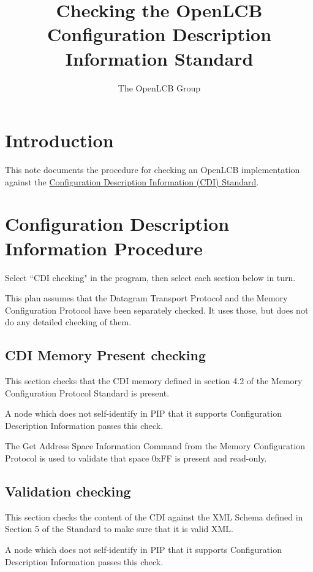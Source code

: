 \documentclass[11pt]{article}
\title{Checking the OpenLCB Configuration Description Information Standard}
\author{The OpenLCB Group}
\begin{document}
\maketitle


\section{Introduction}

This note documents the procedure for checking an OpenLCB implementation against the 
\href{https://nbviewer.org/github/openlcb/documents/blob/master/standards/ConfigurationDescriptionInformationS.pdf}
    {Configuration Description Information (CDI) Standard}.



\section{Configuration Description Information Procedure}

Select ``CDI checking" in the program, 
then select each section below in turn.

This plan assumes that the Datagram Transport Protocol and the Memory Configuration Protocol 
have been separately checked. It uses those, but does not do any detailed checking of them.

\subsection{CDI Memory Present checking}

This section checks that the CDI memory defined in section 4.2 of the Memory
Configuration Protocol Standard is present.

A node which does not self-identify in PIP that it supports
Configuration Description Information passes this check.

The Get Address Space Information Command from the Memory Configuration Protocol
is used to validate that space 0xFF is present and read-only.

\subsection{Validation checking}

This section checks the content of the CDI against the XML Schema 
defined in Section 5 of the Standard to make sure that it is valid XML. 

A node which does not self-identify in PIP that it supports
Configuration Description Information passes this check.
\end{document}
